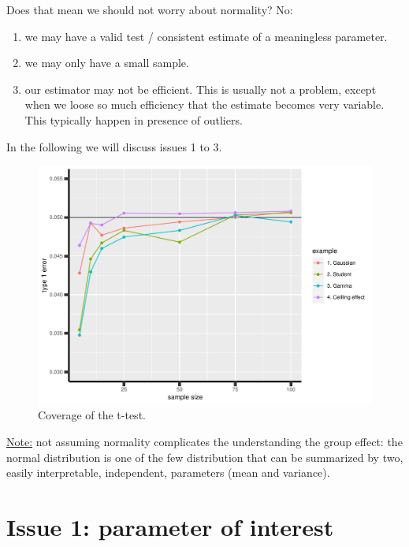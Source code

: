 \documentclass[12pt]{article}
\begin{document}
\clearpage

\noindent Does that mean we should not worry about normality? No:
\begin{enumerate}
\item we may have a valid test / consistent estimate of a meaningless
parameter.
\item we may only have a small sample.
\item our estimator may not be efficient. This is usually not a problem,
except when we loose so much efficiency that the estimate becomes
very variable. This typically happen in presence of outliers.
\end{enumerate}
In the following we will discuss issues 1 to 3.

\begin{figure}[!h]
\centering
\includegraphics[width=\textwidth]{./figures/examples-coverage.pdf}
\caption{\label{fig:coverage}Coverage of the t-test.}
\end{figure}

\uline{Note:} not assuming normality complicates the understanding the group
  effect: the normal distribution is one of the few distribution that
  can be summarized by two, easily interpretable, independent,
  parameters (mean and variance).

\clearpage

\section{Issue 1: parameter of interest}
\label{sec:orgd553f52}
\end{document}
